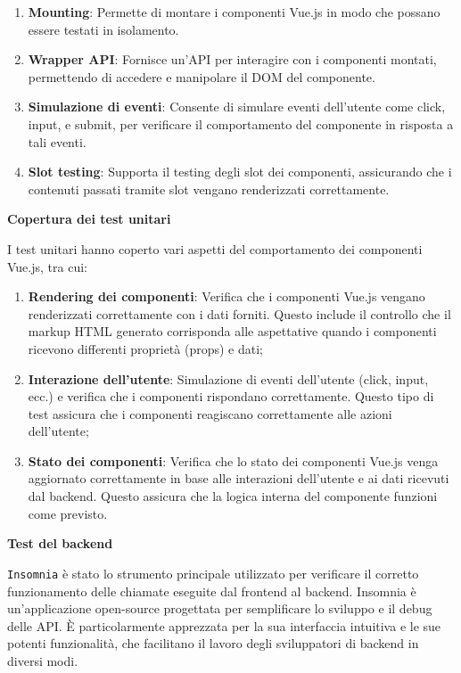 \documentclass[a4paper, 12pt]{book}
\begin{document}
\begin{enumerate}
  \item \textbf{Mounting}: Permette di montare i componenti Vue.js in modo che possano essere testati in isolamento.
  \item \textbf{Wrapper API}: Fornisce un'API per interagire con i componenti montati, permettendo di accedere e manipolare il DOM del componente.
  \item \textbf{Simulazione di eventi}: Consente di simulare eventi dell'utente come click, input, e submit, per verificare il comportamento del
        componente in risposta a tali eventi.
  \item \textbf{Slot testing}: Supporta il testing degli slot dei componenti, assicurando che i contenuti passati tramite slot vengano renderizzati
        correttamente.
\end{enumerate}

\textbf{Copertura dei test unitari}

I test unitari hanno coperto vari aspetti del comportamento dei componenti Vue.js, tra cui:

\begin{enumerate}
  \item \textbf{Rendering dei componenti}: Verifica che i componenti Vue.js vengano renderizzati correttamente con i dati forniti. Questo include il
        controllo che il markup HTML generato corrisponda alle aspettative quando i componenti ricevono differenti proprietà (props) e dati;
  \item \textbf{Interazione dell’utente}: Simulazione di eventi dell’utente (click, input, ecc.) e verifica che i componenti rispondano correttamente.
        Questo tipo di test assicura che i componenti reagiscano correttamente alle azioni dell'utente;
  \item \textbf{Stato dei componenti}: Verifica che lo stato dei componenti Vue.js venga aggiornato correttamente in base alle interazioni
        dell’utente e ai dati ricevuti dal backend. Questo assicura che la logica interna del componente funzioni come previsto.\\
\end{enumerate}

\textbf{Test del backend}

\texttt{Insomnia} è stato lo strumento principale utilizzato per verificare il corretto funzionamento delle chiamate eseguite dal frontend al backend.
Insomnia è un'applicazione open-source progettata per semplificare lo sviluppo e il debug delle API. È particolarmente apprezzata per la sua
interfaccia intuitiva e le sue potenti funzionalità, che facilitano il lavoro degli sviluppatori di backend in diversi modi.\\
\end{document}
